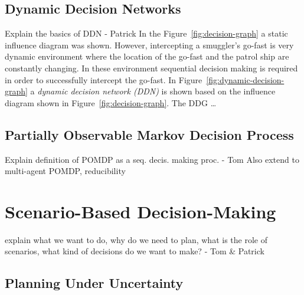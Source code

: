 \documentclass[conference]{IEEEtran}
\begin{document}


\subsection{Dynamic Decision Networks}

{\red Explain the basics of DDN - Patrick}
In the Figure~\ref{fig:decision-graph} a static influence diagram was shown. However, intercepting a smuggler's go-fast is very dynamic environment where the location of the go-fast and the patrol ship are constantly changing. In these environment sequential decision making is required in order to successfully intercept the go-fast. In Figure~\ref{fig:dynamic-decision-graph} a {\em dynamic decision network (DDN)} is shown based on the influence diagram shown in Figure~\ref{fig:decision-graph}. The DDG \ldots

\subsection{Partially Observable Markov Decision Process}

{\red Explain definition of POMDP as a seq. decis. making proc. - Tom}
{\red Also extend to multi-agent POMDP, reducibility}


\section{Scenario-Based Decision-Making}

{\red explain what we want to do, why do we need to plan, what is the role of scenarios, what kind of decisions do we want to make? - Tom \& Patrick}

\subsection{Planning Under Uncertainty}
\end{document}
